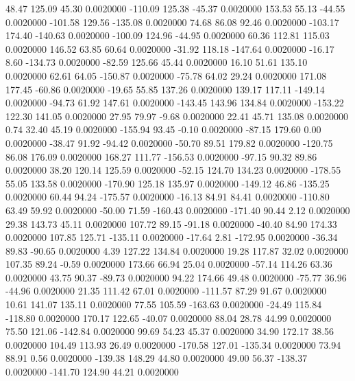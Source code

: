   48.47  125.09   45.30   0.0020000
 -110.09  125.38  -45.37   0.0020000
  153.53   55.13  -44.55   0.0020000
 -101.58  129.56 -135.08   0.0020000
   74.68   86.08   92.46   0.0020000
 -103.17  174.40 -140.63   0.0020000
 -100.09  124.96  -44.95   0.0020000
   60.36  112.81  115.03   0.0020000
  146.52   63.85   60.64   0.0020000
  -31.92  118.18 -147.64   0.0020000
  -16.17    8.60 -134.73   0.0020000
  -82.59  125.66   45.44   0.0020000
   16.10   51.61  135.10   0.0020000
   62.61   64.05 -150.87   0.0020000
  -75.78   64.02   29.24   0.0020000
  171.08  177.45  -60.86   0.0020000
  -19.65   55.85  137.26   0.0020000
  139.17  117.11 -149.14   0.0020000
  -94.73   61.92  147.61   0.0020000
 -143.45  143.96  134.84   0.0020000
 -153.22  122.30  141.05   0.0020000
   27.95   79.97   -9.68   0.0020000
   22.41   45.71  135.08   0.0020000
    0.74   32.40   45.19   0.0020000
 -155.94   93.45   -0.10   0.0020000
  -87.15  179.60    0.00   0.0020000
  -38.47   91.92  -94.42   0.0020000
  -50.70   89.51  179.82   0.0020000
 -120.75   86.08  176.09   0.0020000
  168.27  111.77 -156.53   0.0020000
  -97.15   90.32   89.86   0.0020000
   38.20  120.14  125.59   0.0020000
  -52.15  124.70  134.23   0.0020000
 -178.55   55.05  133.58   0.0020000
 -170.90  125.18  135.97   0.0020000
 -149.12   46.86 -135.25   0.0020000
   60.44   94.24 -175.57   0.0020000
  -16.13   84.91   84.41   0.0020000
 -110.80   63.49   59.92   0.0020000
  -50.00   71.59 -160.43   0.0020000
 -171.40   90.44    2.12   0.0020000
   29.38  143.73   45.11   0.0020000
  107.72   89.15  -91.18   0.0020000
  -40.40   84.90  174.33   0.0020000
  107.85  125.71 -135.11   0.0020000
  -17.64    2.81 -172.95   0.0020000
  -36.34   89.83  -90.65   0.0020000
    4.39  127.22  134.84   0.0020000
   19.28  117.87   32.02   0.0020000
  107.35   89.24   -0.59   0.0020000
  173.66   66.94   25.04   0.0020000
  -57.14  114.26   63.36   0.0020000
   43.75   90.37  -89.73   0.0020000
   94.22  174.66   49.48   0.0020000
  -75.77   36.96  -44.96   0.0020000
   21.35  111.42   67.01   0.0020000
 -111.57   87.29   91.67   0.0020000
   10.61  141.07  135.11   0.0020000
   77.55  105.59 -163.63   0.0020000
  -24.49  115.84 -118.80   0.0020000
  170.17  122.65  -40.07   0.0020000
   88.04   28.78   44.99   0.0020000
   75.50  121.06 -142.84   0.0020000
   99.69   54.23   45.37   0.0020000
   34.90  172.17   38.56   0.0020000
  104.49  113.93   26.49   0.0020000
 -170.58  127.01 -135.34   0.0020000
   73.94   88.91    0.56   0.0020000
 -139.38  148.29   44.80   0.0020000
   49.00   56.37 -138.37   0.0020000
 -141.70  124.90   44.21   0.0020000
